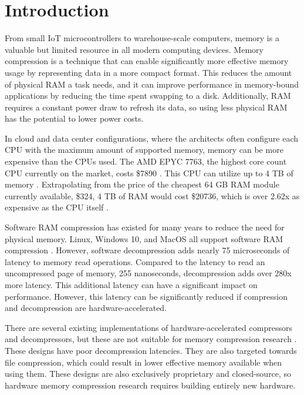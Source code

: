 \documentclass[doublespace,nopageskip]{VTthesis}
\begin{document}
\chapter{Introduction} \label{ch:introduction}
From small IoT microcontrollers to warehouse-scale computers, memory is a valuable but limited resource in all modern computing devices. Memory compression is a technique that can enable significantly more effective memory usage by representing data in a more compact format. This reduces the amount of physical RAM a task needs, and it can improve performance in memory-bound applications by reducing the time spent swapping to a disk. Additionally, RAM requires a constant power draw to refresh its data, so using less physical RAM has the potential to lower power costs.

In cloud and data center configurations, where the architects often configure each CPU with the maximum amount of supported memory, memory can be more expensive than the CPUs used. The AMD EPYC 7763, the highest core count CPU currently on the market, costs \$7890 \cite{epyc_price}. This CPU can utilize up to 4 TB of memory \cite{ibm_epyc}. Extrapolating from the price of the cheapest 64 GB RAM module currently available, \$324, 4 TB of RAM would cost \$20736, which is over 2.62x as expensive as the CPU itself \cite{memory_price}.

Software RAM compression has existed for many years to reduce the need for physical memory. Linux, Windows 10, and MacOS all support software RAM compression \cite{linux_memory_compression, windows10_memory_compression, macos_memory_compression}. However, software decompression adds nearly 75 microseconds of latency to memory read operations. Compared to the latency to read an uncompressed page of memory, 255 nanoseconds, decompression adds over 280x more latency. This additional latency can have a significant impact on performance. However, this latency can be significantly reduced if compression and decompression are hardware-accelerated.

There are several existing implementations of hardware-accelerated compressors and decompressors, but these are not suitable for memory compression research \cite{ibm,microsoft}. These designs have poor decompression latencies. They are also targeted towards file compression, which could result in lower effective memory available when using them. These designs are also exclusively proprietary and closed-source, so hardware memory compression research requires building entirely new hardware.
\end{document}
